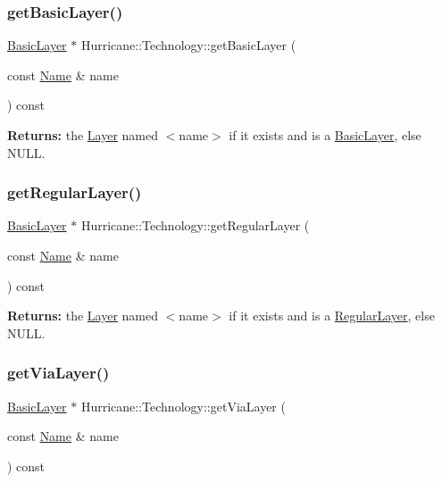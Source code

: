\subsubsection{\texorpdfstring{get\+Basic\+Layer()}{getBasicLayer()}}
{\footnotesize\ttfamily \hyperlink{classHurricane_1_1BasicLayer}{Basic\+Layer} $\ast$ Hurricane\+::\+Technology\+::get\+Basic\+Layer (\begin{DoxyParamCaption}\item[{const \hyperlink{classHurricane_1_1Name}{Name} \&}]{name }\end{DoxyParamCaption}) const}

{\bfseries Returns\+:} the \hyperlink{classHurricane_1_1Layer}{Layer} named {\ttfamily $<$name$>$} if it exists and is a \hyperlink{classHurricane_1_1BasicLayer}{Basic\+Layer}, else {\ttfamily N\+U\+LL}. \mbox{\label{classHurricane_1_1Technology_a0e93f2f749ee9b6efd30de4ef74546cc}} 
\subsubsection{\texorpdfstring{get\+Regular\+Layer()}{getRegularLayer()}}
{\footnotesize\ttfamily \hyperlink{classHurricane_1_1BasicLayer}{Basic\+Layer} $\ast$ Hurricane\+::\+Technology\+::get\+Regular\+Layer (\begin{DoxyParamCaption}\item[{const \hyperlink{classHurricane_1_1Name}{Name} \&}]{name }\end{DoxyParamCaption}) const}

{\bfseries Returns\+:} the \hyperlink{classHurricane_1_1Layer}{Layer} named {\ttfamily $<$name$>$} if it exists and is a \hyperlink{classHurricane_1_1RegularLayer}{Regular\+Layer}, else {\ttfamily N\+U\+LL}. \mbox{\label{classHurricane_1_1Technology_a9edd085c08487642dd8745b66cf40c76}} 
\subsubsection{\texorpdfstring{get\+Via\+Layer()}{getViaLayer()}}
{\footnotesize\ttfamily \hyperlink{classHurricane_1_1BasicLayer}{Basic\+Layer} $\ast$ Hurricane\+::\+Technology\+::get\+Via\+Layer (\begin{DoxyParamCaption}\item[{const \hyperlink{classHurricane_1_1Name}{Name} \&}]{name }\end{DoxyParamCaption}) const}

